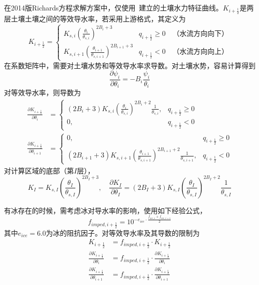 在2014版Richards方程求解方案中，仅使用~\citet{campbell1974}建立的土壤水力特征曲线。$K_{i+\frac{1}{2}}$是两层土壤土壤之间的等效导水率，若采用上游格式，其定义为
\begin{equation}
    K_{i+\frac{1}{2}}=
    \begin{cases}
       K_{s,i}\left(\frac{\theta_{i}}{\theta_{s,i}}\right)^{2 B_i+3}
       & q_{i+\frac{1}{2}} \geqslant 0 \quad \mbox{（水流方向向下）}\\ 
       K_{s,i+1}\left(\frac{\theta_{i+1}}{\theta_{s,i+1}}\right)^{2 B_{i+1}+3}
       & q_{i+\frac{1}{2}} < 0 \quad \mbox{（水流方向向上）}
    \end{cases}
\end{equation}
在系数矩阵中，需要对土壤水势和等效导水率求导数。对土壤水势，容易计算得到
\begin{equation}
\frac{\partial \psi_{i}}{\partial \theta_{i}}=-B_i \frac{\psi_{i}}{\theta_{i}}
\end{equation}
对等效导水率，则导数为
\begin{align}
\frac{\partial K_{i+\frac{1}{2}}}{\partial \theta_{i}} & = 
\begin{cases}
  \left(2B_i+3\right) K_{s,i}\left(\frac{\theta_{i}}{\theta_{s,i}}\right)^{2B_i+2} 
    \frac{1}{\theta_{s,i}}, & q_{i+\frac{1}{2}} \geqslant 0 \\ 
   0, & q_{i+\frac{1}{2}} < 0 
  \end{cases}
\\
\frac{\partial K_{i+\frac{1}{2}}}{\partial \theta_{i+1}} & = 
\begin{cases}
     0, & q_{i+\frac{1}{2}} \geqslant 0 \\
     (2B_{i+1}+3) K_{s,i+1}\left(\frac{\theta_{i+1}}{\theta_{s,i+1}}\right)^{2B_{i+1}+2} \frac{1}{\theta_{ {s,i+1}}}, & q_{i+\frac{1}{2}} < 0 
   \end{cases}
\end{align}
对计算区域的底部（第$I$层），
\begin{equation}
K_{I}=K_{s,I}\left(\frac{\theta_{I}}{\theta_{s,I}}\right)^{2B_I+3}, \quad \frac{\partial K_{I}}
{\partial \theta_{I}} = (2B_I+3) K_{s,I}\left(\frac{\theta_{I}}{\theta_{s,I}}\right)^{2B_I+2} \frac{1}{\theta_{s,I}}
\end{equation}

有冰存在的时候，需考虑冰对导水率的影响，使用如下经验公式，
\begin{equation}
    {f}_{imped,i+\frac{1}{2}}=10^{-e_{ice}\cdot\frac{f_{ice, i}+f_{ice, i+1}}{2}}
\end{equation}
其中$e_{ice}=6.0$为冰的阻抗因子。对等效导水率及其导数的限制为
\begin{equation}
\begin{aligned}
K_{i+\frac{1}{2}} & = {f}_{imped,i+\frac{1}{2}} \cdot K_{i+\frac{1}{2}} \\ 
\frac{\partial K_{i+\frac{1}{2}}}{\partial \theta_{i}}
    & = {f}_{imped,i+\frac{1}{2}} \cdot \frac{\partial K_{i+\frac{1}{2}}}{\partial \theta_{i}} \\ 
\frac{\partial K_{i+\frac{1}{2}}}{\partial \theta_{i+1}} & =
    {f}_{imped,i+\frac{1}{2}} \cdot \frac{\partial K_{i+\frac{1}{2}}}{\partial \theta_{i+1}}
    \end{aligned}
\end{equation}

